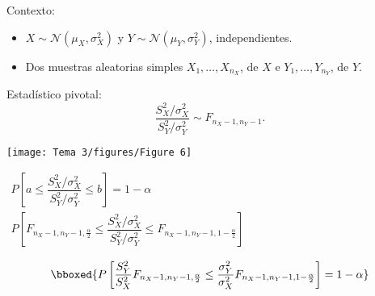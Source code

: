 \begin{tcolorbox}[colback=blue!5!white, colframe=blue!75!black, title=\textbf{Cociente de varianzas, para dos variables aleatorias normales}]
Contexto: 
\begin{itemize}[label=\textbullet]
    \item $X\sim \mathcal{N}(\mu_X,\sigma_X^2)$ y $Y\sim \mathcal{N}(\mu_Y,\sigma_Y^2)$, independientes.
\item Dos muestras aleatorias simples $X_1,\dots,X_{n_X}$, de $X$ e  $Y_1,\dots,Y_{n_Y}$, de $Y$.
\end{itemize}
Estadístico pivotal: \[
\dfrac{S_X^2 / \sigma_X^2}{S_Y^2 / \sigma_Y^2}\sim F_{n_X-1,n_Y-1}.
\] 
\end{tcolorbox}
\begin{minipage}{0.45\textwidth}
    \texttt{[image: Tema 3/figures/Figure 6]}
\end{minipage}$\begin{array}{l}
    P\left[ a\le \dfrac{S_X^2 / \sigma_X^2}{S_Y^2 / \sigma_Y^2}\le b \right] =1-\alpha\\
    P\left[ F_{n_X-1,n_Y-1,\frac{\alpha}{2} }\le \dfrac{S_X^2 / \sigma_X^2}{S_Y^2 / \sigma_Y^2}\le F_{n_X-1,n_Y-1,1-\frac{\alpha}{2} } \right] 
\end{array}$ 

\[
\bboxed{P\left[ \dfrac{S_Y^2}{S_X^2}F_{n_X-1,n_Y-1,\frac{\alpha}{2} }\le \dfrac{\sigma_Y^2}{\sigma_X^2}F_{n_X-1,n_Y-1,1-\frac{\alpha}{2} } \right] =1-\alpha}
\]

